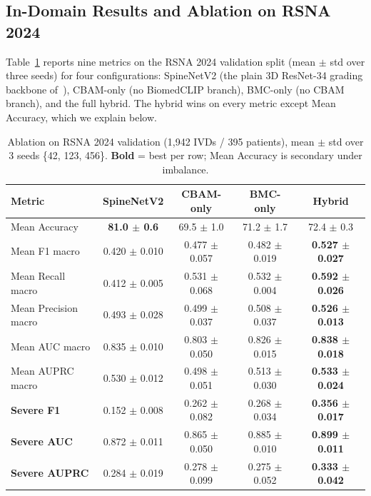\documentclass[runningheads]{llncs}
\newcommand{\best}[1]{\textcolor{best}{\textbf{#1}}}
\begin{document}
\subsection{In-Domain Results and Ablation on RSNA 2024}\label{exp2}

Table~\ref{tab:main} reports nine metrics on the RSNA 2024 validation split (mean $\pm$ std over three seeds) for four configurations: SpineNetV2 (the plain 3D ResNet-34 grading backbone of~\cite{windsor2022}), CBAM-only (no BiomedCLIP branch), BMC-only (no CBAM branch), and the full hybrid. The hybrid wins on every metric except Mean Accuracy, which we explain below.

\begin{table}[t]
\centering
\caption{Ablation on RSNA 2024 validation (1{,}942 IVDs / 395 patients), mean $\pm$ std over 3 seeds \{42, 123, 456\}. \textbf{Bold} = best per row; Mean Accuracy is secondary under imbalance.}
\label{tab:main}
\footnotesize
\setlength{\tabcolsep}{4pt}
\begin{tabular}{@{}lcccc@{}}
\toprule
Metric & SpineNetV2 & CBAM-only & BMC-only & Hybrid \\
\midrule
Mean Accuracy        & \best{81.0 $\pm$ 0.6} & 69.5 $\pm$ 1.0 & 71.2 $\pm$ 1.7 & 72.4 $\pm$ 0.3 \\
Mean F1 macro        & 0.420 $\pm$ 0.010 & 0.477 $\pm$ 0.057 & 0.482 $\pm$ 0.019 & \best{0.527 $\pm$ 0.027} \\
Mean Recall macro    & 0.412 $\pm$ 0.005 & 0.531 $\pm$ 0.068 & 0.532 $\pm$ 0.004 & \best{0.592 $\pm$ 0.026} \\
Mean Precision macro & 0.493 $\pm$ 0.028 & 0.499 $\pm$ 0.037 & 0.508 $\pm$ 0.037 & \best{0.526 $\pm$ 0.013} \\
Mean AUC macro       & 0.835 $\pm$ 0.010 & 0.803 $\pm$ 0.050 & 0.826 $\pm$ 0.015 & \best{0.838 $\pm$ 0.018} \\
Mean AUPRC macro     & 0.530 $\pm$ 0.012 & 0.498 $\pm$ 0.051 & 0.513 $\pm$ 0.030 & \best{0.533 $\pm$ 0.024} \\
\midrule
\textbf{Severe F1}    & 0.152 $\pm$ 0.008 & 0.262 $\pm$ 0.082 & 0.268 $\pm$ 0.034 & \best{0.356 $\pm$ 0.017} \\
\textbf{Severe AUC}   & 0.872 $\pm$ 0.011 & 0.865 $\pm$ 0.050 & 0.885 $\pm$ 0.010 & \best{0.899 $\pm$ 0.011} \\
\textbf{Severe AUPRC} & 0.284 $\pm$ 0.019 & 0.278 $\pm$ 0.099 & 0.275 $\pm$ 0.052 & \best{0.333 $\pm$ 0.042} \\
\bottomrule
\end{tabular}
\end{table}
\end{document}
